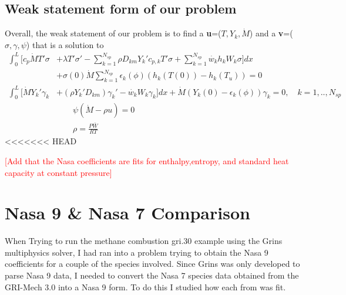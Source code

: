 \documentclass{article}
\newcommand\tab[1][1cm]{\hspace*{#1}}
\newcommand{\red}[1]{\textcolor{red}{[#1]}} %
\begin{document}
\subsection{Weak statement form of our problem}
  Overall, the weak statement of our problem is to find a \textbf{u}=($T,Y_{k},\dot{M}$) and a \textbf{v}=($\sigma,\gamma,\psi$) that is a solution to
  \begin{align*}
    \int_{0}^{L}[c_{p}\dot{M}T'\sigma&+\lambda T'\sigma '-\sum_{k=1}^{N_{sp}}\rho D_{km}Y_{k}'c_{p,k}T'\sigma+\sum_{k=1}^{N_{sp}}\dot{w_{k}}h_{k}W_{k}\sigma ]dx  \\
    &+ \sigma(0)\dot{M}\sum_{k=1}^{N_{sp}}\epsilon _{k}(\phi)(h_{k}(T(0))-h_{k}(T_{u})) = 0 \\
    \int_{0}^{L}[\dot{M}Y_{k}'\gamma_{k}&+(\rho Y_{k}'D_{km})\gamma_{k}'-\dot{w_{k}}W_{k}\gamma_{k}]dx + \dot{M}(Y_{k}(0)-\epsilon_{k}(\phi))\gamma_{k} = 0,\quad k=1,..,N_{sp} \\
   &\qquad \psi(\dot{M}-\rho u) = 0 \\
    &\qquad\rho = \frac{P\bar{W}}{RT} 
    \end{align*}
<<<<<<< HEAD


\red{Add that the Nasa coefficients are fits for enthalpy,entropy, and standard heat capacity at constant pressure}
\section{Nasa 9 \& Nasa 7 Comparison}
\tab When Trying to run the methane combustion gri.30 example using the Grins multiphysics solver, I had ran into a problem trying to obtain the Nasa 9 coefficients for a couple of the species involved. Since Grins was only developed to parse Nasa 9 data, I needed to convert the Nasa 7 species data obtained from the GRI-Mech 3.0 into a Nasa 9 form. To do this I studied how each from was fit.
\end{document}
